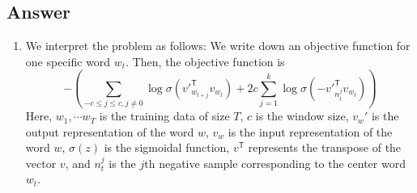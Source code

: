 \documentclass[
	12pt, %
]{../Template/fphw}
\newcommand{\T}{\mathsf{T}}
\begin{document}
\subsection*{Answer}
\begin{enumerate}[label=(\arabic*)]
    \item We interpret the problem as follows: We write down an objective function for one specific word $w_t$. Then, the objective function is 
    \begin{equation}
        -\left(\sum_{-c\leq j\leq c, j\neq 0}\log{\sigma(v'^\T_{w_{t+j}} v_{w_t})} + 2c\sum_{j=1}^{k}\log{\sigma(-v'^\T_{n_t^j} v_{w_t})}\right) \label{eqn: objective_ns}
    \end{equation}
    Here, $w_1,\cdots w_T$ is the training data of size $T$, $c$ is the window size, $v_{w}'$ is the output representation of the word $w$, $v_w$ is the input representation of the word $w$, $\sigma(z)$ is the sigmoidal function, $v^\T$ represents the transpose of the vector $v$, and $n_t^j$ is the $j$th negative sample corresponding to the center word $w_t$.


\end{enumerate}
\end{document}
